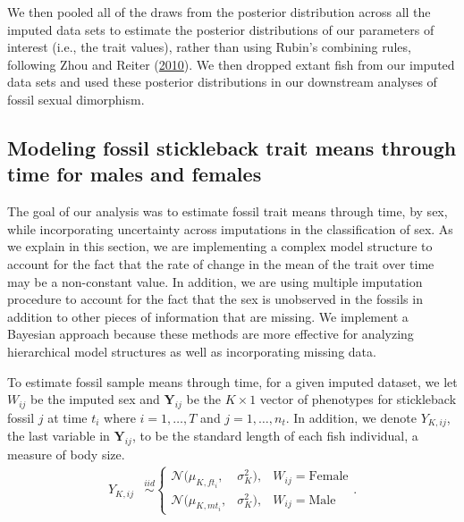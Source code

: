 \documentclass[
  12pt,
]{article}
\begin{document}
We then pooled all of the draws from the posterior distribution across
all the imputed data sets to estimate the posterior distributions of our
parameters of interest (i.e., the trait values), rather than using
Rubin's combining rules, following Zhou and Reiter
(\protect\hyperlink{ref-ZhouReiter2010}{2010}). We then dropped extant
fish from our imputed data sets and used these posterior distributions
in our downstream analyses of fossil sexual dimorphism.

\hypertarget{modeling-fossil-stickleback-trait-means-through-time-for-males-and-females}{%
\subsection{Modeling fossil stickleback trait means through time for
males and
females}\label{modeling-fossil-stickleback-trait-means-through-time-for-males-and-females}}

The goal of our analysis was to estimate fossil trait means through
time, by sex, while incorporating uncertainty across imputations in the
classification of sex. As we explain in this section, we are
implementing a complex model structure to account for the fact that the
rate of change in the mean of the trait over time may be a non-constant
value. In addition, we are using multiple imputation procedure to
account for the fact that the sex is unobserved in the fossils in
addition to other pieces of information that are missing. We implement a
Bayesian approach because these methods are more effective for analyzing
hierarchical model structures as well as incorporating missing data.

To estimate fossil sample means through time, for a given imputed
dataset, we let \(W_{ij}\) be the imputed sex and
\(\boldsymbol{Y}_{ij}\) be the \(K \times 1\) vector of phenotypes for
stickleback fossil \(j\) at time \(t_i\) where \(i = 1, \ldots, T\) and
\(j = 1,\ldots,n_{t}\). In addition, we denote \(Y_{K,ij}\), the last
variable in \(\boldsymbol{Y}_{ij}\), to be the standard length of each
fish individual, a measure of body size. \begin{align}
{Y}_{K,ij} & \overset{iid}{\sim}\left\{\begin{array}{lll} \mathcal{N}(\mu_{K,ft_i},&\sigma_{K}^2), & W_{ij} = \text{Female} \\ \mathcal{N}(\mu_{K,mt_i},&\sigma_{K}^2), & W_{ij} = \text{Male} \end{array}\right..
\label{eq:stl}
\end{align}
\end{document}

